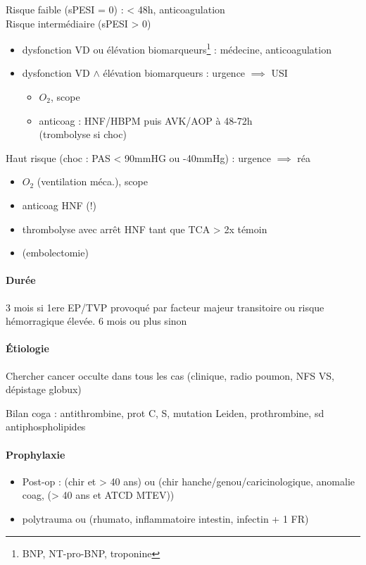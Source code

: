 Risque faible (sPESI = 0) : \faHospitalO{} < 48h, anticoagulation\\
Risque intermédiaire (sPESI > 0)
\begin{itemize}
\item dysfonction VD ou élévation biomarqueurs\footnote{BNP, NT-pro-BNP,
    troponine} : \faHospitalO{}
  médecine, anticoagulation
\item dysfonction VD $\wedge$ élévation biomarqueurs : urgence \danger{}
  $\implies$ USI
  \begin{itemize}
  \item $O_2$, scope
  \item anticoag : HNF/HBPM puis AVK/AOP à 48-72h\\
  (trombolyse si choc)
    \end{itemize}

\end{itemize}
Haut risque (choc : PAS < 90mmHG ou -40mmHg) : urgence \skull $\implies$ réa
\begin{itemize}
\item $O_2$ (ventilation méca.), scope
\item anticoag HNF (!)
\item thrombolyse avec arrêt HNF tant que TCA > 2x témoin
\item (embolectomie)
\end{itemize}

\paragraph{Durée}
3 mois si 1ere EP/TVP provoqué par facteur majeur transitoire ou risque
hémorragique élevée. 6 mois ou plus sinon

\paragraph{Étiologie}
Chercher cancer occulte dans tous les cas (clinique, radio poumon, NFS VS,
dépistage globux)

Bilan coga : {antithrombine, prot C, S}, mutation {Leiden, prothrombine}, sd
antiphospholipides

\paragraph{Prophylaxie}
\begin{itemize}
\item Post-op : (chir et > 40 ans) ou (chir hanche/genou/caricinologique, anomalie
  coag, (> 40 ans et ATCD MTEV))
\item polytrauma ou ({rhumato, inflammatoire intestin, infectin} + 1 FR)

\end{itemize}


